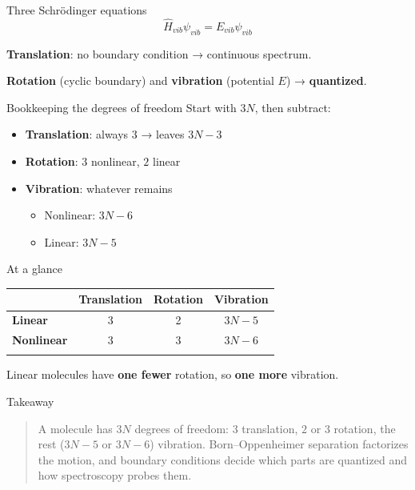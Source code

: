 \documentclass[
  ignorenonframetext,
  aspectratio=169,
  handout]{beamer}
\newcounter{none} %
\providecommand{\tightlist}{%
  \setlength{\itemsep}{0pt}\setlength{\parskip}{0pt}}
\begin{document}
\begin{frame}
\begin{block}{Three Schrödinger equations}
\[\hat{H}_{vib}\psi_{vib} = E_{vib}\psi_{vib}\]

\textbf{Translation}: no boundary condition → continuous spectrum.

\textbf{Rotation} (cyclic boundary) and \textbf{vibration} (potential
\(E\)) → \textbf{quantized}.
\end{block}

\begin{block}{Bookkeeping the degrees of freedom}
\protect{}\label{bookkeeping-the-degrees-of-freedom}
Start with \(3N\), then subtract:

\begin{itemize}
\tightlist
\item
  \textbf{Translation}: always \(3\) → leaves \(3N - 3\)
\end{itemize}

\begin{itemize}
\tightlist
\item
  \textbf{Rotation}: \(3\) nonlinear, \(2\) linear
\end{itemize}

\begin{itemize}
\tightlist
\item
  \textbf{Vibration}: whatever remains

  \begin{itemize}
  \tightlist
  \item
    Nonlinear: \(3N - 6\)
  \item
    Linear: \(3N - 5\)
  \end{itemize}
\end{itemize}
\end{block}

\begin{block}{At a glance}
\protect{}\label{at-a-glance}
{\def\LTcaptype{none} %
\begin{longtable}[]{@{}lccc@{}}
\toprule\noalign{}
& Translation & Rotation & Vibration \\
\midrule\noalign{}
\endhead
\textbf{Linear} & 3 & 2 & \(3N-5\) \\
\textbf{Nonlinear} & 3 & 3 & \(3N-6\) \\
\bottomrule\noalign{}
\end{longtable}
}

Linear molecules have \textbf{one fewer} rotation, so \textbf{one more}
vibration.
\end{block}
\end{frame}

\begin{frame}{Takeaway}
\protect{}\label{takeaway}
\begin{quote}
A molecule has \(3N\) degrees of freedom: \(3\) translation, \(2\) or
\(3\) rotation, the rest (\(3N-5\) or \(3N-6\)) vibration.
Born--Oppenheimer separation factorizes the motion, and boundary
conditions decide which parts are quantized and how spectroscopy probes
them.
\end{quote}
\end{frame}
\end{document}
